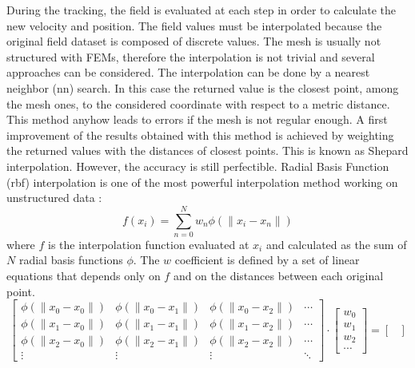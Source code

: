 \begin{refsection}
  During the tracking, the field is evaluated at each step in order to calculate the new velocity and position. The field values must be interpolated because the original field dataset is composed of discrete values. The mesh is usually not structured with FEMs, therefore the interpolation is not trivial and several approaches can be considered. The interpolation can be done by a nearest neighbor (\acrshort{nn}) search. In this case the returned value is the closest point, among the mesh ones, to the considered coordinate with respect to a metric distance. This method anyhow leads to errors if the mesh is not regular enough. A first improvement of the results obtained with this method is achieved by weighting the returned values with the distances of closest points. This is known as Shepard interpolation. However, the accuracy is still perfectible. Radial Basis Function (\acrshort{rbf}) interpolation is one of the most powerful interpolation method working on unstructured data \cite{Wright2003}:
  \begin{equation}
    f(x_{i}) = \sum_{n=0}^{N} w_{n} \phi(\lVert x_{i} - x_{n}\rVert)
  \end{equation}
  where $f$ is the interpolation function evaluated at $x_{i}$ and calculated as the sum of $N$ radial basis functions $\phi$. The $w$ coefficient is defined by a set of linear equations that depends only on $f$ and on the distances between each original point.
  \begin{equation}
    \begin{bmatrix}
      \phi(\lVert x_{0} - x_{0}\rVert) & \phi(\lVert x_{0} - x_{1}\rVert) & \phi(\lVert x_{0} - x_{2}\rVert) & \cdots \\
      \phi(\lVert x_{1} - x_{0}\rVert) & \phi(\lVert x_{1} - x_{1}\rVert) & \phi(\lVert x_{1} - x_{2}\rVert) & \cdots \\
      \phi(\lVert x_{2} - x_{0}\rVert) & \phi(\lVert x_{2} - x_{1}\rVert) & \phi(\lVert x_{2} - x_{2}\rVert) & \cdots \\
      \vdots                           & \vdots                           & \vdots                           & \ddots
    \end{bmatrix}
    \cdot
    \begin{bmatrix}
      w_{0} \\
      w_{1} \\
      w_{2} \\
      \cdots
    \end{bmatrix}
    =
    \begin{bmatrix}

\end{bmatrix}
\end{equation}
\end{refsection}
